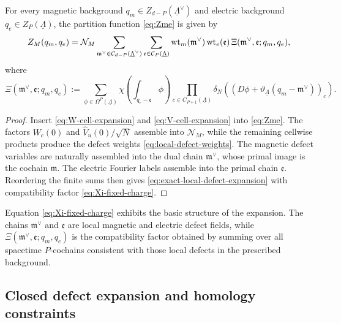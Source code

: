 \begin{prop}
	\label{prop:exact-local-defect-expansion}
	For every magnetic background \(q_m\in Z_{d-P}(\underline\Lambda^\vee)\) and electric
	background \(q_e\in Z_P(\underline\Lambda)\), the partition function \eqref{eq:Zme} is given by
	\begin{equation}
		Z_M(q_m,q_e)
		=
		\mathcal N_M
		\sum_{\mathfrak m^\vee\in \mathcal C_{d-P}(\underline\Lambda^\vee)}
		\sum_{\mathfrak e\in \mathcal C_P(\underline\Lambda)}
		\mathrm{wt}_m(\mathfrak m^\vee)\,\mathrm{wt}_e(\mathfrak e)\,
		\Xi(\mathfrak m^\vee,\mathfrak e;q_m,q_e),
		\label{eq:exact-local-defect-expansion}
	\end{equation}
	where
	\begin{equation}
		\Xi(\mathfrak m^\vee,\mathfrak e;q_m,q_e)
		:=
		\sum_{\phi\in \Omega^P(\underline\Lambda)}
		\chi \left(\int_{q_e-\mathfrak e}\phi\right)
		\prod_{c\in C_{P+1}(\underline\Lambda)}
		\delta_N \left((D\phi+\vartheta_{\underline\Lambda}(q_m-\mathfrak m^\vee))_c\right).
		\label{eq:Xi-fixed-charge}
	\end{equation}
\end{prop}

\begin{proof}
	Insert \eqref{eq:W-cell-expansion} and \eqref{eq:V-cell-expansion} into
	\eqref{eq:Zme}. The factors \(W_c(0)\) and
	\(\widehat V_u(0)/\sqrt N\) assemble into \(\mathcal N_M\), while the remaining
	cellwise products produce the defect weights \eqref{eq:local-defect-weights}. The
	magnetic defect variables are naturally assembled into the dual chain
	\(\mathfrak m^\vee\), whose primal image is the cochain \(\mathfrak m\). The electric
	Fourier labels assemble into the primal chain \(\mathfrak e\). Reordering the finite sums
	then gives \eqref{eq:exact-local-defect-expansion} with compatibility factor
	\eqref{eq:Xi-fixed-charge}.
\end{proof}

Equation \eqref{eq:Xi-fixed-charge} exhibits the basic structure of the expansion. The
chains \(\mathfrak m^\vee\) and \(\mathfrak e\) are local magnetic and electric defect
fields, while \(\Xi(\mathfrak m^\vee,\mathfrak e;q_m,q_e)\) is the compatibility factor
obtained by summing over all spacetime \(P\)-cochains consistent with those local defects in
the prescribed background.

\subsection{Closed defect expansion and homology constraints}
\label{sec:closedDefectGas}

